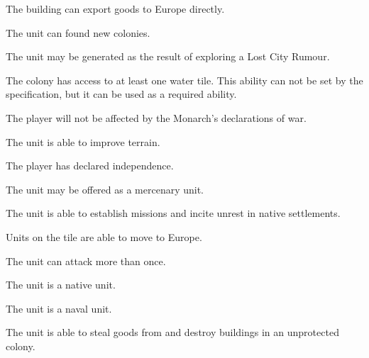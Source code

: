 \documentclass[12pt]{book}
\begin{document}
The building can export goods to Europe directly.

\affectsUnit

The unit can found new colonies.

\affectsUnit

The unit may be generated as the result of exploring a Lost City Rumour.

\affectsColony

The colony has access to at least one water tile. This ability can not
be set by the specification, but it can be used as a required ability.

\affectsPlayer

The player will not be affected by the Monarch's declarations of war.

\affectsUnit

The unit is able to improve terrain.

\affectsPlayer

The player has declared independence.

\affectsUnit

The unit may be offered as a mercenary unit.

\affectsUnit

The unit is able to establish missions and incite unrest in native
settlements.

\affectsTile

Units on the tile are able to move to Europe.

\affectsUnit

The unit can attack more than once.

\affectsUnit

The unit is a native unit.

\affectsUnit

The unit is a naval unit.

\affectsUnit

The unit is able to steal goods from and destroy buildings in an
unprotected colony.

\affectsUnit
\end{document}
